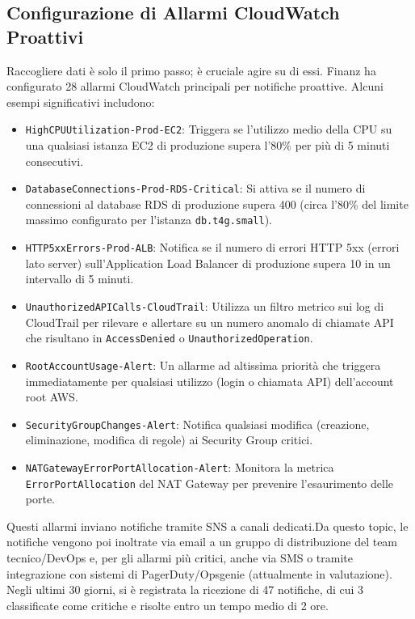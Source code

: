 \subsection{Configurazione di Allarmi CloudWatch Proattivi}
\label{subsec:cloudwatch-alarms_cap2}
Raccogliere dati è solo il primo passo; è cruciale agire su di essi. Finanz ha configurato 28 allarmi CloudWatch principali per notifiche proattive. Alcuni esempi significativi includono:
\begin{itemize}
    \item \texttt{HighCPUUtilization-Prod-EC2}: Triggera se l'utilizzo medio della CPU su una qualsiasi istanza EC2 di produzione supera l'80\% per più di 5 minuti consecutivi.
    \item \texttt{DatabaseConnections-Prod-RDS-Critical}: Si attiva se il numero di connessioni al database RDS di produzione supera 400 (circa l'80\% del limite massimo configurato per l'istanza \texttt{db.t4g.small}).
    \item \texttt{HTTP5xxErrors-Prod-ALB}: Notifica se il numero di errori HTTP 5xx (errori lato server) sull'Application Load Balancer di produzione supera 10 in un intervallo di 5 minuti.
    \item \texttt{UnauthorizedAPICalls-CloudTrail}: Utilizza un filtro metrico sui log di CloudTrail per rilevare e allertare su un numero anomalo di chiamate API che risultano in \texttt{AccessDenied} o \texttt{UnauthorizedOperation}.
    \item \texttt{RootAccountUsage-Alert}: Un allarme ad altissima priorità che triggera immediatamente per qualsiasi utilizzo (login o chiamata API) dell'account root AWS.
    \item \texttt{SecurityGroupChanges-Alert}: Notifica qualsiasi modifica (creazione, eliminazione, modifica di regole) ai Security Group critici.
    \item \texttt{NATGatewayErrorPortAllocation-Alert}: Monitora la metrica \texttt{Error\discretionary{-}{}{}Port\discretionary{-}{}{}Allocation} del NAT Gateway per prevenire l'esaurimento delle porte.
\end{itemize}
Questi allarmi inviano notifiche tramite SNS a canali dedicati.Da questo topic, le notifiche vengono poi inoltrate via email a un gruppo di distribuzione del team tecnico/DevOps e, per gli allarmi più critici, anche via SMS o tramite integrazione con sistemi di PagerDuty/Opsgenie (attualmente in valutazione). Negli ultimi 30 giorni, si è registrata la ricezione di 47 notifiche, di cui 3 classificate come critiche e risolte entro un tempo medio di 2 ore.

